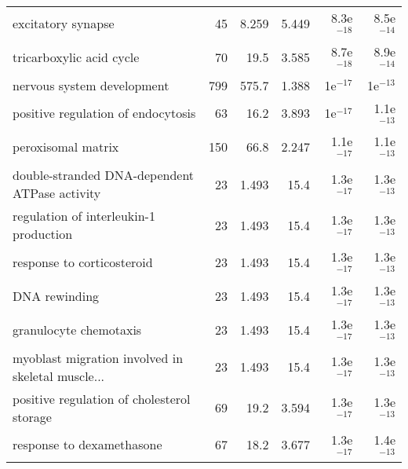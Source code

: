 \begin{longtable}{lrrrrr}
                                excitatory synapse &                      45 &                   8.259 &      5.449 &         8.3e$^{-18}$ &         8.5e$^{-14}$ \\
                          tricarboxylic acid cycle &                      70 &                    19.5 &      3.585 &         8.7e$^{-18}$ &         8.9e$^{-14}$ \\
                        nervous system development &                     799 &                   575.7 &      1.388 &           1e$^{-17}$ &           1e$^{-13}$ \\
                positive regulation of endocytosis &                      63 &                    16.2 &      3.893 &           1e$^{-17}$ &         1.1e$^{-13}$ \\
                                peroxisomal matrix &                     150 &                    66.8 &      2.247 &         1.1e$^{-17}$ &         1.1e$^{-13}$ \\
     double-stranded DNA-dependent ATPase activity &                      23 &                   1.493 &       15.4 &         1.3e$^{-17}$ &         1.3e$^{-13}$ \\
            regulation of interleukin-1 production &                      23 &                   1.493 &       15.4 &         1.3e$^{-17}$ &         1.3e$^{-13}$ \\
                        response to corticosteroid &                      23 &                   1.493 &       15.4 &         1.3e$^{-17}$ &         1.3e$^{-13}$ \\
                                     DNA rewinding &                      23 &                   1.493 &       15.4 &         1.3e$^{-17}$ &         1.3e$^{-13}$ \\
                            granulocyte chemotaxis &                      23 &                   1.493 &       15.4 &         1.3e$^{-17}$ &         1.3e$^{-13}$ \\
 myoblast migration involved in skeletal muscle... &                      23 &                   1.493 &       15.4 &         1.3e$^{-17}$ &         1.3e$^{-13}$ \\
        positive regulation of cholesterol storage &                      69 &                    19.2 &      3.594 &         1.3e$^{-17}$ &         1.3e$^{-13}$ \\
                         response to dexamethasone &                      67 &                    18.2 &      3.677 &         1.3e$^{-17}$ &         1.4e$^{-13}$ \\

\end{longtable}
